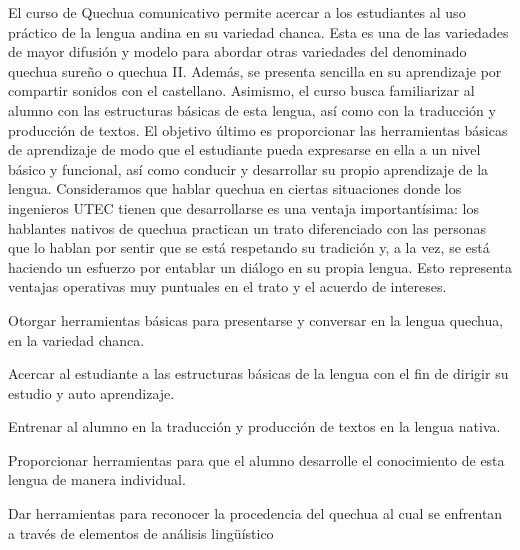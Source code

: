 \begin{syllabus}


\begin{justification}
El curso de Quechua comunicativo permite acercar a los estudiantes al uso práctico de la lengua andina en su variedad chanca. Esta es una de las variedades de mayor difusión y modelo para abordar otras variedades del denominado quechua sureño o quechua II. Además, se presenta sencilla en su aprendizaje por compartir sonidos con el castellano. Asimismo, el curso busca familiarizar al alumno con las estructuras básicas de esta lengua, así como con la traducción y producción de textos. El objetivo último es proporcionar las herramientas básicas de aprendizaje de modo que el estudiante pueda expresarse en ella a un nivel básico y funcional, así como conducir y desarrollar su propio aprendizaje de la lengua.
Consideramos que hablar quechua en ciertas situaciones donde los ingenieros UTEC tienen que desarrollarse es una ventaja importantísima: los hablantes nativos de quechua practican un trato diferenciado con las personas que lo hablan por sentir que se está respetando su tradición y, a la vez, se está haciendo un esfuerzo por entablar un diálogo en su propia lengua. Esto representa ventajas operativas muy puntuales en el trato y el acuerdo de intereses. 
\end{justification}

\begin{goals}
\item Otorgar herramientas básicas para presentarse y conversar en la lengua quechua, en la variedad chanca.
\item Acercar al estudiante a las estructuras básicas de la lengua con el fin de dirigir su estudio y auto aprendizaje.
\item Entrenar al alumno en la traducción y producción de textos en la lengua nativa.
\item Proporcionar herramientas para que el alumno desarrolle el conocimiento de esta lengua de manera individual.
\item Dar herramientas para reconocer la procedencia del quechua al cual se enfrentan a través de elementos de análisis lingüístico
\end{goals}

\begin{outcomes}
\end{outcomes}


\end{syllabus}

